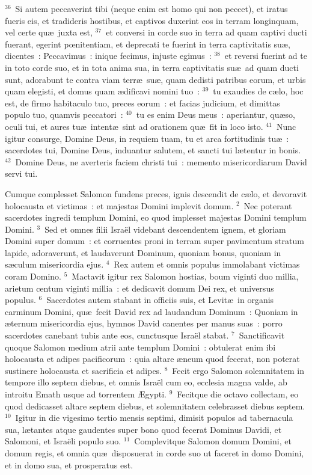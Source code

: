 ${}^{36}$~Si autem peccaverint tibi (neque enim est homo qui non peccet), et iratus fueris eis, et tradideris hostibus, et captivos duxerint eos in terram longinquam, vel certe qu\ae\ juxta est,
${}^{37}$~et conversi in corde suo in terra ad quam captivi ducti fuerant, egerint pœnitentiam, et deprecati te fuerint in terra captivitatis su\ae , dicentes~: Peccavimus~: inique fecimus, injuste egimus~:
${}^{38}$~et reversi fuerint ad te in toto corde suo, et in tota anima sua, in terra captivitatis su\ae\ ad quam ducti sunt, adorabunt te contra viam terr\ae\ su\ae , quam dedisti patribus eorum, et urbis quam elegisti, et domus quam \ae dificavi nomini tuo~:
${}^{39}$~tu exaudies de c\ae lo, hoc est, de firmo habitaculo tuo, preces eorum~: et facias judicium, et dimittas populo tuo, quamvis peccatori~:
${}^{40}$~tu es enim Deus meus~: aperiantur, qu\ae so, oculi tui, et aures tu\ae\ intent\ae\ sint ad orationem qu\ae\ fit in loco isto.
${}^{41}$~Nunc igitur consurge, Domine Deus, in requiem tuam, tu et arca fortitudinis tu\ae~: sacerdotes tui, Domine Deus, induantur salutem, et sancti tui l\ae tentur in bonis.
${}^{42}$~Domine Deus, ne averteris faciem christi tui~: memento misericordiarum David servi tui.

\bchapter
\lettrine[lines=3,image=true,loversize=0.05,lraise=-0.03]{C}{}umque complesset Salomon fundens preces, ignis descendit de c\ae lo, et devoravit holocausta et victimas~: et majestas Domini implevit domum.
${}^{2}$~Nec poterant sacerdotes ingredi templum Domini, eo quod implesset majestas Domini templum Domini.
${}^{3}$~Sed et omnes filii Isra\"el videbant descendentem ignem, et gloriam Domini super domum~: et corruentes proni in terram super pavimentum stratum lapide, adoraverunt, et laudaverunt Dominum, quoniam bonus, quoniam in s\ae culum misericordia ejus.
${}^{4}$~Rex autem et omnis populus immolabant victimas coram Domino.
${}^{5}$~Mactavit igitur rex Salomon hostias, boum viginti duo millia, arietum centum viginti millia~: et dedicavit domum Dei rex, et universus populus.
${}^{6}$~Sacerdotes autem stabant in officiis suis, et Levit\ae\ in organis carminum Domini, qu\ae\ fecit David rex ad laudandum Dominum~: Quoniam in \ae ternum misericordia ejus, hymnos David canentes per manus suas~: porro sacerdotes canebant tubis ante eos, cunctusque Isra\"el stabat.
${}^{7}$~Sanctificavit quoque Salomon medium atrii ante templum Domini~: obtulerat enim ibi holocausta et adipes pacificorum~: quia altare \ae neum quod fecerat, non poterat sustinere holocausta et sacrificia et adipes.
${}^{8}$~Fecit ergo Salomon solemnitatem in tempore illo septem diebus, et omnis Isra\"el cum eo, ecclesia magna valde, ab introitu Emath usque ad torrentem \AE gypti.
${}^{9}$~Fecitque die octavo collectam, eo quod dedicasset altare septem diebus, et solemnitatem celebrasset diebus septem.
${}^{10}$~Igitur in die vigesimo tertio mensis septimi, dimisit populos ad tabernacula sua, l\ae tantes atque gaudentes super bono quod fecerat Dominus Davidi, et Salomoni, et Isra\"eli populo suo.
${}^{11}$~Complevitque Salomon domum Domini, et domum regis, et omnia qu\ae\ disposuerat in corde suo ut faceret in domo Domini, et in domo sua, et prosperatus est.


